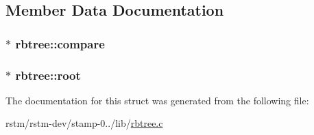 \subsection{Member Data Documentation}
\hypertarget{structrbtree_a2c509d927e5fcd8ea5290b1ae5d5fcf6}{
\subsubsection[{compare}]{$\ast$ rbtree\-::compare}}\label{structrbtree_a2c509d927e5fcd8ea5290b1ae5d5fcf6}
\hypertarget{structrbtree_a5599215e65e20a8fdec3717dc143982d}{
\subsubsection[{root}]{$\ast$ rbtree\-::root}}\label{structrbtree_a5599215e65e20a8fdec3717dc143982d}


The documentation for this struct was generated from the following file\-:\begin{DoxyCompactItemize}
\item 
rstm/rstm-\/dev/stamp-\/0../lib/\hyperlink{rbtree_8c}{rbtree.\-c}\end{DoxyCompactItemize}
